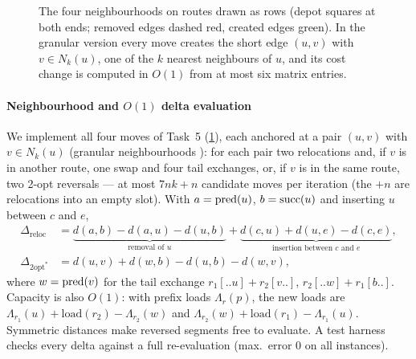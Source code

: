\begin{figure}[t]
\caption{The four neighbourhoods on routes drawn as rows (depot squares at both ends; removed edges dashed red,
created edges green). In the granular version every move creates the short edge $(u,v)$ with $v\in N_k(u)$, one of
the $k$ nearest neighbours of $u$, and its cost change is computed in $O(1)$ from at most six matrix entries.}
\label{fig:moves}
\end{figure}

\paragraph{Neighbourhood and $O(1)$ delta evaluation} We implement all four moves of Task~5
(\cref{fig:moves}), each anchored at a pair $(u,v)$ with $v\in N_k(u)$ (granular neighbourhoods
\citep{toth2003granular}): for each pair two relocations and, if $v$ is in another route, one swap and four
tail exchanges, or, if $v$ is in the same route, two 2-opt reversals --- at most $7nk+n$ candidate moves per
iteration (the $+n$ are relocations into an empty slot). With $a=\operatorname{pred}(u)$, $b=\operatorname{succ}(u)$ and inserting $u$ between $c$ and $e$,
\begin{align}
\Delta_{\mathrm{reloc}}&=\underbrace{d(a,b)-d(a,u)-d(u,b)}_{\text{removal of }u}+\underbrace{d(c,u)+d(u,e)-d(c,e)}_{\text{insertion between }c\text{ and }e},\label{eq:delta}\\
\Delta_{\mathrm{2opt^\ast}}&=d(u,v)+d(w,b)-d(u,b)-d(w,v),\label{eq:delta2}
\end{align}
where $w=\operatorname{pred}(v)$ for the tail exchange $r_1[..u]+r_2[v..]$, $r_2[..w]+r_1[b..]$. Capacity is also
$O(1)$: with prefix loads $\Lambda_r(p)$, the new loads are
$\Lambda_{r_1}(u)+\mathrm{load}(r_2)-\Lambda_{r_2}(w)$ and $\Lambda_{r_2}(w)+\mathrm{load}(r_1)-\Lambda_{r_1}(u)$.
Symmetric distances make reversed segments free to evaluate. A test harness checks every delta against a
full re-evaluation (max.\ error 0 on all instances).

